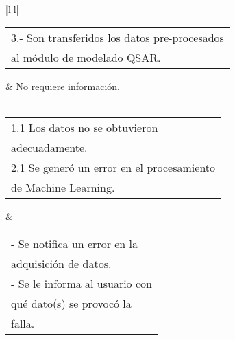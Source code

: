\begin{longtable}{|l|l|}
\begin{tabular}[c]{@{}l@{}}3.- Son transferidos los datos pre-procesados\\ al módulo de modelado QSAR.\end{tabular}                                               & No requiere información.                                                                                                                                                                                                \\ \hline
{}                                                                                                                                                                                                                                                                                                                                     \\ \hline
\begin{tabular}[c]{@{}l@{}}1.1 Los datos no se obtuvieron\\ adecuadamente.\\ 2.1 Se generó un error en el procesamiento\\ de Machine Learning.\end{tabular}       & \begin{tabular}[c]{@{}l@{}}- Se notifica un error en la\\ adquisición de datos.\\ - Se le informa al usuario con\\ qué dato(s) se provocó la\\ falla.\end{tabular}                                                      \\ \hline
{}                                                                                                                                                                                                                                            \\ \hline
{}                                                                                                                                                                                                   \\ \hline

\end{longtable}
